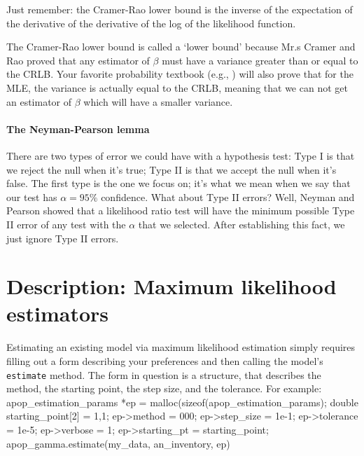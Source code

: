 Just remember: the Cramer-Rao lower bound is the inverse of the expectation of the
derivative of the derivative of the log of the likelihood function.

The Cramer-Rao lower bound is
called a `lower bound' because Mr.s Cramer and Rao proved that any
estimator of $\beta$ must have a variance greater than or equal to the
CRLB. Your favorite probability textbook (e.g., \cite{casella:berger})
will also prove that for the MLE, the variance is actually equal to the
CRLB, meaning that we can not get an estimator of $\beta$ which will
have a smaller variance.

\paragraph{The Neyman-Pearson lemma} There are two types of error we could
have with a hypothesis test: Type I is that we reject the null when it's
true; Type II is that we accept the null when it's false. The first type
is the one we focus on; it's what we mean when we say that our
test has $\alpha=95\%$ confidence. What about Type II errors? Well,
Neyman and Pearson showed that a likelihood ratio test will have the
minimum possible Type II error of any test with the $\alpha$ that we
selected. After establishing this fact, we just ignore Type II errors.

\section{Description: Maximum likelihood estimators} 


Estimating an existing model via maximum likelihood estimation simply requires 
filling out a form describing your preferences and then calling the model's {\tt estimate} method.
The form in question is a  structure, that
describes the method, the starting point, the step size, and the
tolerance.
For example:
apop_estimation_params *ep  = malloc(sizeof(apop_estimation_params);
double  starting_point[2]   = {1,1};
ep->method      = 000;
ep->step_size   = 1e-1;
ep->tolerance   = 1e-5;
ep->verbose     = 1;
ep->starting_pt = starting_point;
apop_gamma.estimate(my_data, an_inventory, ep)


